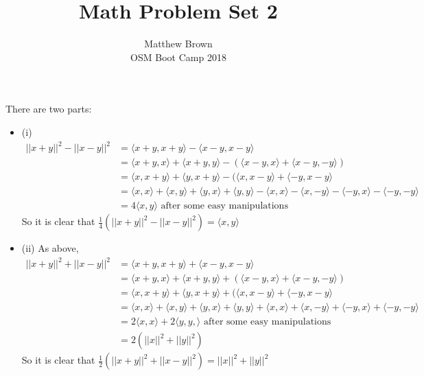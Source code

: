 \documentclass[12pt]{article}
\newenvironment{problem}[2][Problem]{\begin{trivlist}
\item[\hskip \labelsep {\bfseries #1}\hskip \labelsep {\bfseries #2.}]}{\end{trivlist}}
\theoremstyle{definition}
\theoremstyle{definition}
\theoremstyle{definition}
\theoremstyle{definition}
\begin{document}
\title{Math Problem Set 2}
\author{Matthew Brown\\ 
OSM Boot Camp 2018} %
 
\maketitle
 
\begin{problem}{3.1} There are two parts: 
\begin{itemize}
\item (i)
\begin{align*}
||x+y||^2 -||x-y||^2 &= \langle x+y,x+y \rangle - \langle x-y,x-y \rangle \\
&= \langle x+y,x \rangle + \langle x+y,y \rangle - (\langle x-y, x \rangle + \langle x-y, -y\rangle) \\
&= \langle x,x+y \rangle + \langle y,x+y \rangle - (\langle x, x-y \rangle + \langle -y,x-y\rangle \\
&= \langle x, x \rangle + \langle x, y\rangle + \langle y,x \rangle + \langle y,y \rangle - \langle x, x \rangle - \langle x, -y \rangle - \langle -y,x \rangle - \langle -y,-y \rangle \\
&= 4\langle x,y \rangle \text{ after some easy manipulations} 
\end{align*}
So it is clear that $\frac{1}{4}(||x+y||^2 -||x-y||^2) = \langle x, y \rangle $
\item (ii)
As above, 
\begin{align*}
||x+y||^2 + ||x-y||^2 &= \langle x+y,x+y \rangle + \langle x-y,x-y \rangle \\
&= \langle x+y,x \rangle + \langle x+y,y \rangle + (\langle x-y, x \rangle + \langle x-y, -y\rangle) \\
&= \langle x,x+y \rangle + \langle y,x+y \rangle + (\langle x, x-y \rangle + \langle -y,x-y\rangle \\
&= \langle x, x \rangle + \langle x, y\rangle + \langle y,x \rangle + \langle y,y \rangle + \langle x, x \rangle + \langle x, -y \rangle + \langle -y,x \rangle + \langle -y,-y \rangle \\
&= 2 \langle x, x \rangle + 2 \langle y, y, \rangle \text{ after some easy manipulations} \\
&= 2(||x||^2 + ||y||^2) 
\end{align*}
So it is clear that $\frac{1}{2}(||x+y||^2 + ||x-y||^2) = ||x||^2 + ||y||^2$
\end{itemize}
\end{problem}
\end{document}
